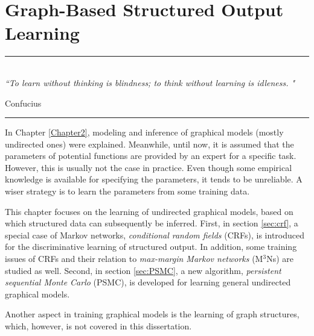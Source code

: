 
\chapter{Graph-Based Structured Output Learning} %
\label{Chapter3} %



\rule{\textwidth}{0.4pt} \\[0.5cm]
\textit{``To learn without thinking is blindness; to think without learning is idleness. "}

\begin{flushright}
Confucius
\end{flushright}
\rule{\textwidth}{0.4pt} 

In Chapter \ref{Chapter2}, modeling and inference of graphical models (mostly undirected ones) were explained. Meanwhile, until now, it is assumed that   
the parameters of potential functions are provided by an expert for a specific task. However, this is usually not the case in practice.      
Even though some empirical knowledge is available for specifying the parameters, it tends to be unreliable. 
A wiser strategy is to learn the parameters from some training data.      

This chapter focuses on the learning of undirected graphical models, based on which structured data can subsequently be inferred.      
First, in section \ref{sec:crf}, a special case of Markov networks, \emph{conditional random fields} (CRFs), is introduced for the discriminative learning      
of structured output. In addition, some training issues of CRFs and their relation to \emph{max-margin Markov networks} (M$^3$Ns) are studied as well.   
Second, in section \ref{sec:PSMC},  a new algorithm, \emph{persistent sequential Monte Carlo} (PSMC), 
is developed for learning general undirected graphical models.   

Another aspect in training graphical models is the learning of graph structures, which, however, is not covered in this dissertation.    


